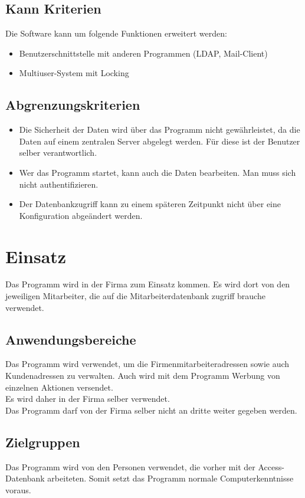 \subsection{Kann Kriterien}
Die Software kann um folgende Funktionen erweitert werden:
\begin{itemize}
\item Benutzerschnittstelle mit anderen Programmen (LDAP, Mail-Client)
\item Multiuser-System mit Locking
\end{itemize}
%
\subsection{Abgrenzungskriterien}
%
\begin{itemize}
\item Die Sicherheit der Daten wird über das Programm nicht gewährleistet, da die
Daten auf einem zentralen Server abgelegt werden. Für diese ist der Benutzer
selber verantwortlich.
\item Wer das Programm startet, kann auch die Daten bearbeiten. Man muss sich
nicht authentifizieren.
\item Der Datenbankzugriff kann zu einem späteren Zeitpunkt nicht über eine
Konfiguration abgeändert werden.
\end{itemize}
\section{Einsatz}
Das Programm wird in der Firma zum Einsatz kommen. Es wird dort von den
jeweiligen Mitarbeiter, die auf die Mitarbeiterdatenbank zugriff brauche verwendet. \\

\subsection{Anwendungsbereiche}
Das Programm wird verwendet, um die Firmenmitarbeiteradressen sowie auch
Kundenadressen zu verwalten. Auch wird mit dem Programm Werbung von
einzelnen Aktionen versendet.\\
Es wird daher in der Firma selber verwendet.\\
Das Programm darf von der Firma selber nicht an dritte weiter gegeben werden.
\subsection{Zielgruppen}
Das Programm wird von den Personen verwendet, die vorher mit der Access-
Datenbank arbeiteten. Somit setzt das Programm normale Computerkenntnisse
voraus.
